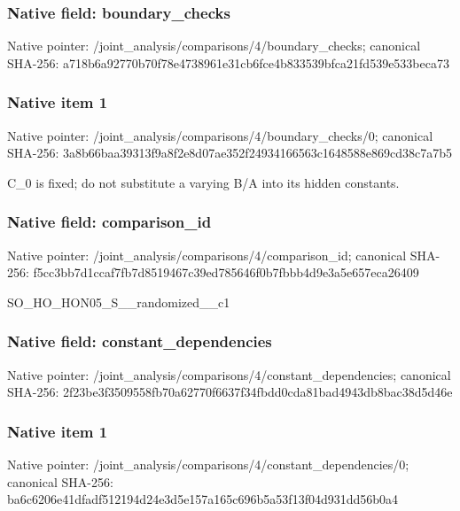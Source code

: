 \documentclass[10pt,a4paper]{article}
\begin{document}
\subsubsection{Native field: boundary\_\allowbreak{}checks}
Native pointer: /joint\_\allowbreak{}analysis/comparisons/4/boundary\_\allowbreak{}checks; canonical SHA-256: a718b6a92770b70f78e4738961e31cb6fce4b833539bfca21fd539e533beca73

\subsubsection{Native item 1}
Native pointer: /joint\_\allowbreak{}analysis/comparisons/4/boundary\_\allowbreak{}checks/0; canonical SHA-256: 3a8b66baa39313f9a8f2e8d07ae352f24934166563c1648588e869cd38c7a7b5

\begingroup\raggedright\sloppy C\_\allowbreak{}0 is fixed;\allowbreak{} do not substitute a varying B/\allowbreak{}A into its hidden constants.\par\endgroup

\subsubsection{Native field: comparison\_\allowbreak{}id}
Native pointer: /joint\_\allowbreak{}analysis/comparisons/4/comparison\_\allowbreak{}id; canonical SHA-256: f5cc3bb7d1ccaf7fb7d8519467c39ed785646f0b7fbbb4d9e3a5e657eca26409

\begingroup\raggedright\sloppy SO\_\allowbreak{}HO\_\allowbreak{}HON05\_\allowbreak{}S\_\allowbreak{}\_\allowbreak{}randomized\_\allowbreak{}\_\allowbreak{}c1\par\endgroup

\subsubsection{Native field: constant\_\allowbreak{}dependencies}
Native pointer: /joint\_\allowbreak{}analysis/comparisons/4/constant\_\allowbreak{}dependencies; canonical SHA-256: 2f23be3f3509558fb70a62770f6637f34fbdd0cda81bad4943db8bac38d5d46e

\subsubsection{Native item 1}
Native pointer: /joint\_\allowbreak{}analysis/comparisons/4/constant\_\allowbreak{}dependencies/0; canonical SHA-256: ba6c6206e41dfadf512194d24e3d5e157a165c696b5a53f13f04d931dd56b0a4
\end{document}
